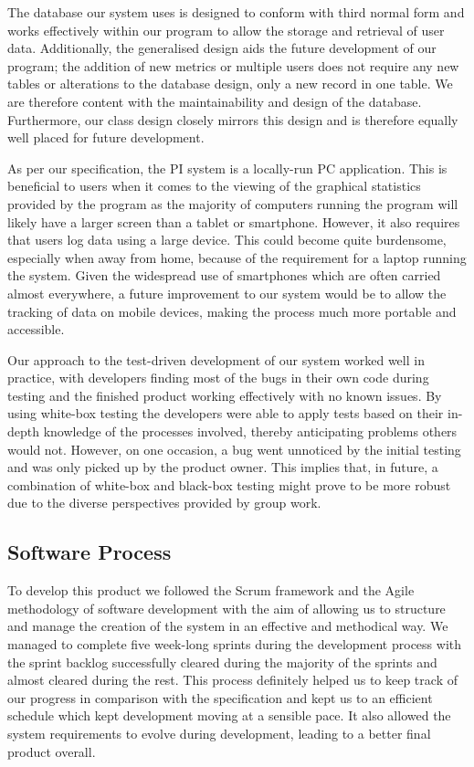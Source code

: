 \documentclass[12pt]{article}
\begin{document}
The database our system uses is designed to conform with third normal form 
and works effectively within our program to allow the storage and retrieval 
of user data. Additionally, the generalised design aids the future development 
of our program; the addition of new metrics or multiple users does not require 
any new tables or alterations to the database design, only a new record in one 
table. We are therefore content with the maintainability and design of the 
database. Furthermore, our class design closely mirrors this design and is 
therefore equally well placed for future development.\par

As per our specification, the PI system is a locally-run PC application. This 
is beneficial to users when it comes to the viewing of the graphical statistics 
provided by the program as the majority of computers running the program will 
likely have a larger screen than a tablet or smartphone. However, it also 
requires that users log data using a large device. This could become quite 
burdensome, especially when away from home, because of the requirement for a 
laptop running the system. Given the widespread use of smartphones which are 
often carried almost everywhere, a future improvement to our system would be 
to allow the tracking of data on mobile devices, making the process much more 
portable and accessible.\par

Our approach to the test-driven development of our system worked well in 
practice, with developers finding most of the bugs in their own code during 
testing and the finished product working effectively with no known issues. By 
using white-box testing the developers were able to apply tests based on their 
in-depth knowledge of the processes involved, thereby anticipating problems 
others would not. However, on one occasion, a bug went unnoticed by the initial 
testing and was only picked up by the product owner. This implies that, in 
future, a combination of white-box and black-box testing might prove to be more 
robust due to the diverse perspectives provided by group work.\par  

\subsection{Software Process}
To develop this product we followed the Scrum framework and the Agile 
methodology of software development with the aim of allowing us to structure 
and manage the creation of the system in an effective and methodical way. We 
managed to complete five week-long sprints during the development process with 
the sprint backlog successfully cleared during the majority of the sprints and 
almost cleared during the rest.  This process definitely helped us to keep 
track of our progress in comparison with the specification and kept us to an 
efficient schedule which kept development moving at a sensible pace. It also 
allowed the system requirements to evolve during development, leading to a 
better final product overall.\par
\end{document}

